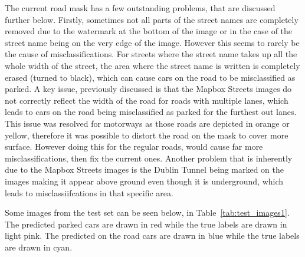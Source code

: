 The current road mask has a few outstanding problems, that are discussed further below.
Firstly, sometimes not all parts of the street names are completely removed due to the watermark at the bottom of the image or in the case of the street name being on the very edge of the image. However this seems to rarely be the cause of misclassifications.
For streets where the street name takes up all the whole width of the street, the area where the street name is written is completely erased (turned to black), which can cause cars on the road to be misclassified as parked.
A key issue, previously discussed is that the Mapbox Streets images do not correctly reflect the width of the road for roads with multiple lanes, which leads to cars on the road being misclassified as parked for the furthest out lanes.
This issue was resolved for motorways as those roads are depicted in orange or yellow, therefore it was possible to distort the road on the mask to cover more surface. However doing this for the regular roads, would cause far more misclassifications, then fix the current ones.
Another problem that is inherently due to the Mapbox Streets images is the Dublin Tunnel being marked on the images making it appear above ground even though it is underground, which leads to misclassiifcations in that specific area.

Some images from the test set can be seen below, in Table~\ref{tab:test_images1}.
The predicted parked cars are drawn in red while the true labels are drawn in light pink. The predicted on the road cars are drawn in blue while the true labels are drawn in cyan.

